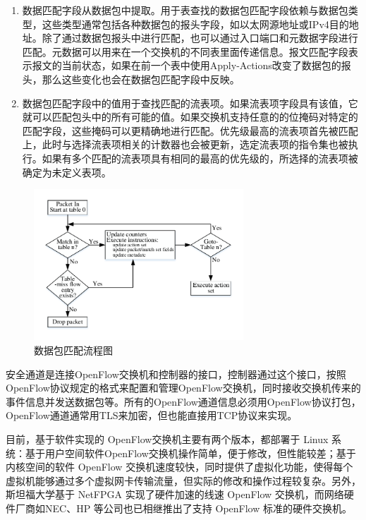 \begin{enumerate}
\item 数据匹配字段从数据包中提取。用于表查找的数据包匹配字段依赖与数据包类型，这些类型通常包括各种数据包的报头字段，如以太网源地址或IPv4目的地址。除了通过数据包报头中进行匹配，也可以通过入口端口和元数据字段进行匹配。元数据可以用来在一个交换机的不同表里面传递信息。报文匹配字段表示报文的当前状态，如果在前一个表中使用Apply-Actions改变了数据包的报头，那么这些变化也会在数据包匹配字段中反映。 
\item 数据包匹配字段中的值用于查找匹配的流表项。如果流表项字段具有该值，它就可以匹配包头中的所有可能的值。如果交换机支持任意的的位掩码对特定的匹配字段，这些掩码可以更精确地进行匹配。优先级最高的流表项首先被匹配上，此时与选择流表项相关的计数器也会被更新，选定流表项的指令集也被执行。如果有多个匹配的流表项具有相同的最高的优先级的，所选择的流表项被确定为未定义表项。
\end{enumerate}

\begin{figure}[!htb]
  \centering
  \includegraphics[width=0.7\textwidth]{logo/match}
  \caption{数据包匹配流程图}
  \label{fig:match}
\end{figure}

安全通道是连接OpenFlow交换机和控制器的接口，控制器通过这个接口，按照 OpenFlow协议规定的格式来配置和管理OpenFlow交换机，同时接收交换机传来的事件信息并发送数据包等。所有的OpenFlow通道信息必须用OpenFlow协议打包，OpenFlow通道通常用TLS来加密，但也能直接用TCP协议来实现。

目前，基于软件实现的 OpenFlow交换机主要有两个版本\cite{openflow-2}，都部署于 Linux 系统：基于用户空间软件OpenFlow交换机操作简单，便于修改，但性能较差；基于内核空间的软件 OpenFlow 交换机\cite{openflow-3}速度较快，同时提供了虚拟化功能，使得每个虚拟机能够通过多个虚拟网卡传输流量，但实际的修改和操作过程较复杂。另外，斯坦福大学基于 NetFPGA 实现了硬件加速的线速 OpenFlow 交换机\cite{openflow-4}，而网络硬件厂商如NEC、HP 等公司也已相继推出了支持 OpenFlow 标准的硬件交换机\cite{openflow-1}。
